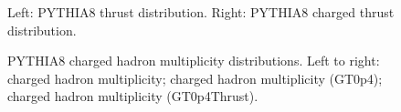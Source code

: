 \begin{figure}[H]
\centering
{}\hfill
{}\hfill %
\caption{Left: PYTHIA8 thrust distribution. Right: PYTHIA8 charged thrust distribution.}
\end{figure}

\begin{figure}[H]
\centering
{}\hfill
{}\hfill
{}\hfill
\caption{PYTHIA8 charged hadron multiplicity distributions. Left to right: charged hadron multiplicity; charged hadron multiplicity (GT0p4); charged hadron multiplicity (GT0p4Thrust).}
\end{figure}

